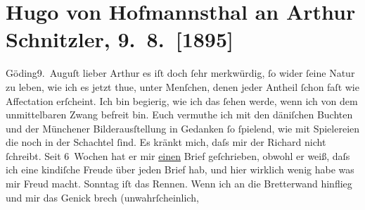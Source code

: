 

               \section[Hugo von Hofmannsthal an Arthur Schnitzler, 9. 8. {[}1895{]}]{ Hugo von Hofmannsthal an Arthur Schnitzler, 9. 8. {[}1895{]}}\nopagebreak{}\rehead{ }\begin{ledgroupsized}[t]{13cm}\normalsize\beginnumbering{} \toendnotes[C]{\smallbreak\pagebreak[2]} 
\pstart
           \raggedleft{}{\pb}Göding9. Auguſt\pend
           \pstart{}lieber Arthur\pend\pstart
           es iſt doch ſehr merkwürdig, ſo wider ſeine Natur zu leben, wie ich es jetzt
                    thue, unter Menſchen, denen jeder Antheil ſchon faſt wie Affectation erſcheint.
                    Ich bin begierig, wie ich das ſehen werde, wenn ich von dem unmittelbaren Zwang
                    befreit bin. Euch vermuthe ich mit den däniſchen Buchten und der Münchener
                    Bilderausſtellung in {\pb}Gedanken ſo ſpielend, wie mit Spielereien die noch in der Schachtel ſind. Es
                    kränkt mich, daſs mir der Richard nicht
                    ſchreibt. Seit 6 Wochen hat er mir \uline{einen} Brief
                    geſchrieben, obwohl er weiß, daſs ich eine kindiſche Freude über jeden Brief
                    hab, und hier wirklich wenig habe was mir Freud macht. Sonntag iſt das Rennen.
                    Wenn ich an die Bretterwand hinflieg und mir das Genick brech (unwahrſcheinlich,

\end{ledgroupsized}
